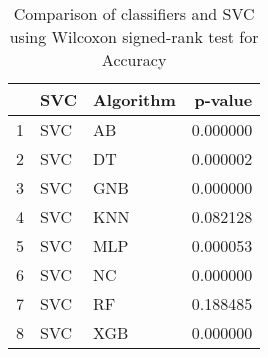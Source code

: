 \begin{table}
\footnotesize
\caption{Comparison of classifiers and SVC using Wilcoxon signed-rank test for Accuracy}
\label{tab:SVC wilcoxon Accuracy comparison}
\begin{tabular}{lllr}
\hline
 & SVC & Algorithm & p-value \\
\hline
1 & SVC & AB & 0.000000 \\
2 & SVC & DT & 0.000002 \\
3 & SVC & GNB & 0.000000 \\
4 & SVC & KNN & 0.082128 \\
5 & SVC & MLP & 0.000053 \\
6 & SVC & NC & 0.000000 \\
7 & SVC & RF & 0.188485 \\
8 & SVC & XGB & 0.000000 \\
\hline
\end{tabular}
\end{table}
